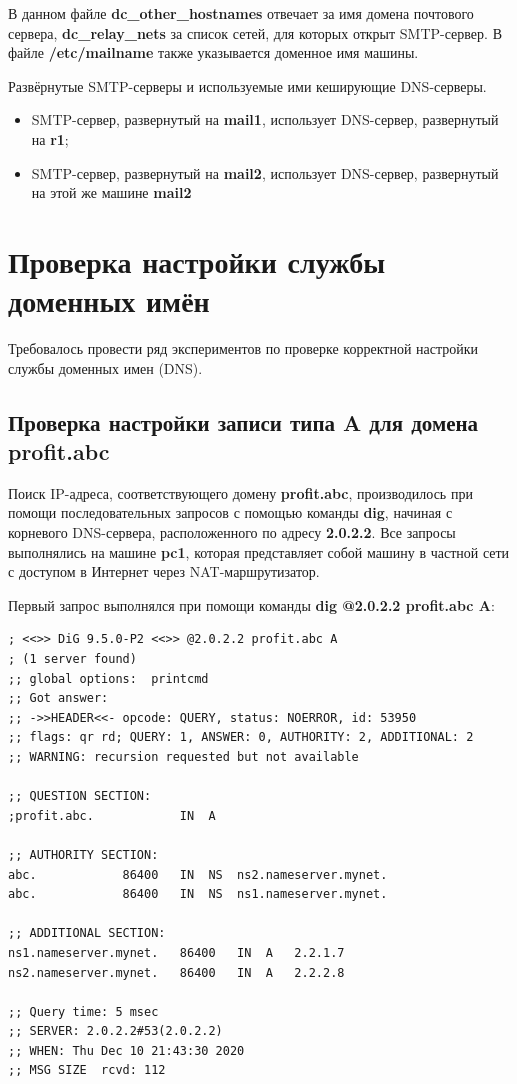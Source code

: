 \documentclass[a4paper,12pt]{article}
\begin{document}
В данном файле \textbf{dc\_other\_hostnames} отвечает за имя домена почтового сервера, \textbf{dc\_relay\_nets} за список сетей, для которых открыт SMTP-сервер. В файле \textbf{/etc/mailname} также указывается доменное имя машины.

Развёрнутые SMTP-серверы и используемые ими кеширующие DNS-серверы.
\begin{itemize}
\item SMTP-сервер, развернутый на \textbf{mail1}, использует DNS-сервер, развернутый на \textbf{r1};
\item SMTP-сервер, развернутый на \textbf{mail2}, использует DNS-сервер, развернутый на этой же машине \textbf{mail2}
\end{itemize}


\section{Проверка настройки службы доменных имён}

Требовалось провести ряд экспериментов по проверке корректной настройки службы доменных имен (DNS).

\subsection{Проверка настройки записи типа A для домена profit.abc}

Поиск IP-адреса, соответствующего домену \textbf{profit.abc}, производилось при помощи последовательных запросов с помощью команды \textbf{dig}, начиная с корневого DNS-сервера, расположенного по адресу \textbf{2.0.2.2}. Все запросы выполнялись на машине \textbf{pc1}, которая представляет собой машину в частной сети с доступом в Интернет через NAT-маршрутизатор.

Первый запрос выполнялся при помощи команды \textbf{dig @2.0.2.2 profit.abc A}:
\begin{verbatim}
; <<>> DiG 9.5.0-P2 <<>> @2.0.2.2 profit.abc A
; (1 server found)
;; global options:  printcmd
;; Got answer:
;; ->>HEADER<<- opcode: QUERY, status: NOERROR, id: 53950
;; flags: qr rd; QUERY: 1, ANSWER: 0, AUTHORITY: 2, ADDITIONAL: 2
;; WARNING: recursion requested but not available

;; QUESTION SECTION:
;profit.abc.			IN	A

;; AUTHORITY SECTION:
abc.			86400	IN	NS	ns2.nameserver.mynet.
abc.			86400	IN	NS	ns1.nameserver.mynet.

;; ADDITIONAL SECTION:
ns1.nameserver.mynet.	86400	IN	A	2.2.1.7
ns2.nameserver.mynet.	86400	IN	A	2.2.2.8

;; Query time: 5 msec
;; SERVER: 2.0.2.2#53(2.0.2.2)
;; WHEN: Thu Dec 10 21:43:30 2020
;; MSG SIZE  rcvd: 112
\end{verbatim}
\end{document}
